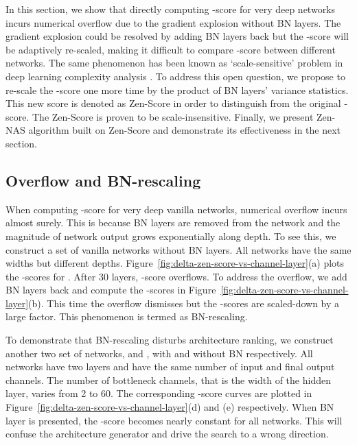 \documentclass{article}
\begin{document}
In this section, we show that directly computing -score for very deep networks incurs numerical overflow due to the gradient explosion without BN layers. The gradient explosion could be resolved by adding BN layers back but the -score will be adaptively re-scaled, making it difficult to compare -score between different networks. The same phenomenon has been known as `scale-sensitive' problem in deep learning complexity analysis \cite{bartlettSpectrallynormalizedMarginBounds2017,neyshaburRoleOverparametrizationGeneralization2018}. To address this open question, we propose to re-scale the -score one more time by the product of BN layers' variance statistics. This new score is denoted as Zen-Score in order to distinguish from the original -score. The Zen-Score is proven to be scale-insensitive. Finally, we present Zen-NAS algorithm built on Zen-Score and demonstrate its effectiveness in the next section.

\subsection{Overflow and BN-rescaling}

When computing -score for very deep vanilla networks, numerical overflow incurs almost surely. This is because  BN layers are removed from the network and the magnitude of network output grows exponentially along depth. To see this, we construct a set of vanilla networks  without BN layers. All networks have the same widths but different depths. Figure~\ref{fig:delta-zen-score-vs-channel-layer}(a) plots the -scores for . After 30 layers, -score overflows. To address the overflow, we add BN layers back and compute the -scores in  Figure~\ref{fig:delta-zen-score-vs-channel-layer}(b). This time the overflow  dismisses but the -scores are scaled-down by a large factor. This phenomenon is termed as BN-rescaling.

To demonstrate that BN-rescaling disturbs architecture ranking, we construct another two set of networks,  and , with and without BN respectively. All networks have two layers and have the same number of input and final output channels. The number of bottleneck channels, that is the width of the hidden layer, varies from 2 to 60. The corresponding -score curves are plotted in Figure~\ref{fig:delta-zen-score-vs-channel-layer}(d) and (e) respectively. When BN layer is presented, the -score becomes nearly constant for all networks. This will confuse the architecture generator and drive the search to a wrong direction.
\end{document}
